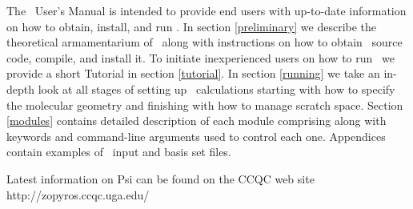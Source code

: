 The \PSIthree\ User's Manual is intended to provide end users with
up-to-date information on how to obtain, install, and run \PSIthree .
In section \ref{preliminary} we describe the theoretical
armamentarium of \PSIthree\ along with instructions on how to
obtain \PSIthree\ source code, compile, and install it.
To initiate inexperienced users on how to run \PSIthree\
we provide a short Tutorial in section \ref{tutorial}.
In section \ref{running} we take an in-depth look at all stages of
setting up \PSIthree\ calculations starting with how to specify the molecular
geometry and finishing with how to manage scratch space.
Section \ref{modules} contains detailed description of each module
comprising \PSIthree along with keywords and command-line
arguments used to control each one.
Appendices contain examples of \PSIthree\ input and basis set files.

Latest information on Psi can be found on the CCQC
web site 
{http://zopyros.ccqc.uga.edu/}


